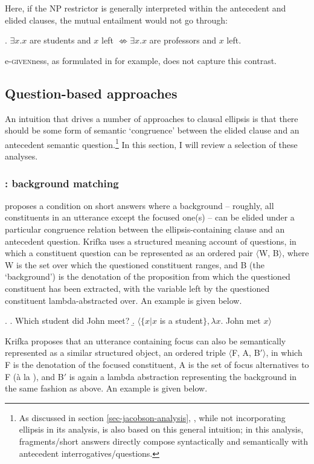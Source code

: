 \documentclass[doublespace]{umthesis}
\begin{document}
Here, if the NP restrictor is generally interpreted within the antecedent and elided clauses, the mutual entailment would not go through:

\ex. 	$\exists x. x$ are students and $x$ left $\not \Leftrightarrow \exists x. x$ are professors and $x$ left.

e-\textsc{given}ness, as formulated in \cite{Me01} for example, does not capture this contrast. %

\subsection{Question-based approaches} \label{sec:question-based-approaches}

An intuition that drives a number of approaches to clausal ellipsis is that there should be some form of semantic `congruence' between the elided clause and an antecedent semantic question.\footnote{As discussed in section \ref{sec-jacobson-analysis}, \cite{Ja13}, while not incorporating ellipsis in its analysis, is also based on this general intuition; in this analysis, fragments/short answers directly compose syntactically and semantically with antecedent interrogatives/questions.} In this section, I will review a selection of these analyses.

\subsubsection{\cite{Kr06}: background matching}

\cite{Kr06} proposes a condition on short answers where a background -- roughly, all constituents in an utterance except the focused one(s) -- can be elided under a particular congruence relation between the ellipsis-containing clause and an antecedent question. Krifka uses a structured meaning account of questions, in which a constituent question can be represented as an ordered pair $\langle$W, B$\rangle$, where W is the set over which the questioned constituent ranges, and B (the `background') is the denotation of the proposition from which the questioned constituent has been extracted, with the variable left by the questioned constituent lambda-abstracted over. An example is given below.

\ex. 	\a. Which student did John meet?
	\b. $\langle \{ x | x$ is a student$\}, \lambda x. $ John met $x \rangle$
	
Krifka proposes that an utterance containing focus can also be semantically represented as a similar structured object, an ordered triple $\langle$F, A, B$'\rangle$, in which F is the denotation of the focused constituent, A is the set of focus alternatives to F (\`a la \cite{Ro92Foc}), and B$'$ is again a lambda abstraction representing the background in the same fashion as above. An example is given below.
\end{document}
